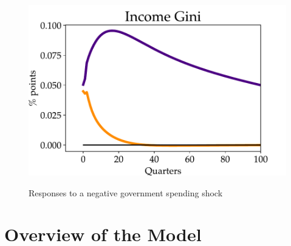 \begin{figure}[!t]
\begin{center}
\begin{minipage}{0.5\textwidth}
\end{minipage}\hspace*{\fill}
\begin{minipage}{0.5\textwidth}
\includegraphics[scale=.5]{text/chapter1/Figures/Fiscal_Consolidation/gini_FC}
\end{minipage}
\caption{Responses to a negative government spending shock} 

\label{Fiscal_Consolidation}
\end{center}
\end{figure}



\section{Overview of the Model}

